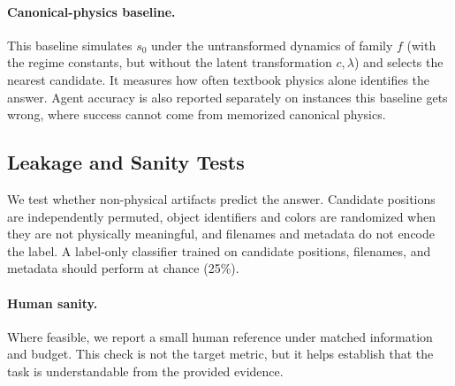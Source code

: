 \paragraph{Canonical-physics baseline.} This baseline simulates $s_0$ under the untransformed dynamics of family $f$ (with the regime constants, but without the latent transformation $c,\lambda$) and selects the nearest candidate. It measures how often textbook physics alone identifies the answer. Agent accuracy is also reported separately on instances this baseline gets wrong, where success cannot come from memorized canonical physics. 

\subsection{Leakage and Sanity Tests}

We test whether non-physical artifacts predict the answer. Candidate positions are independently permuted, object identifiers and colors are randomized when they are not physically meaningful, and filenames and metadata do not encode the label. A label-only classifier trained on candidate positions, filenames, and metadata should perform at chance (25\%). 

\paragraph{Human sanity.} Where feasible, we report a small human reference under matched information and budget. This check is not the target metric, but it helps establish that the task is understandable from the provided evidence. 
